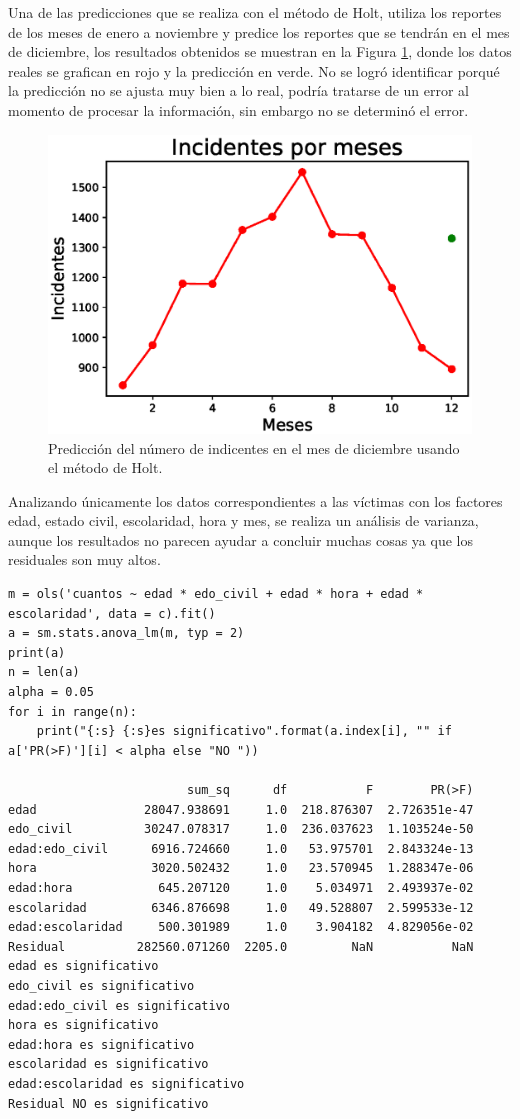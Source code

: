 \documentclass[final,5p,times]{elsarticle}
\begin{document}
Una de las predicciones que se realiza con el m\'etodo de Holt, utiliza los reportes de los meses de enero a noviembre y predice los reportes que se tendrán en el mes de diciembre, los resultados obtenidos se muestran en la Figura \ref{predic_mes}, donde los datos reales se grafican en rojo y la predicci\'on en verde. No se logr\'o identificar porqu\'e la predicci\'on no se ajusta muy bien a lo real, podr\'ia tratarse de un error al momento de procesar la informaci\'on, sin embargo no se determin\'o el error.
\begin{figure}
\centering
\includegraphics[scale=0.5]{pred_mes.eps}
\caption{Predicción del n\'umero de indicentes en el mes de diciembre usando el m\'etodo de Holt.}
\label{predic_mes}
\end{figure}

Analizando \'unicamente los datos correspondientes a las v\'ictimas con los factores edad, estado civil, escolaridad, hora y mes, se realiza un an\'alisis de varianza, aunque los resultados no parecen ayudar a concluir muchas cosas ya que los residuales son muy altos.
\begin{lstlisting}
m = ols('cuantos ~ edad * edo_civil + edad * hora + edad * escolaridad', data = c).fit() 
a = sm.stats.anova_lm(m, typ = 2)
print(a)
n = len(a)
alpha = 0.05
for i in range(n):
    print("{:s} {:s}es significativo".format(a.index[i], "" if a['PR(>F)'][i] < alpha else "NO "))
    
                         sum_sq      df           F        PR(>F)
edad               28047.938691     1.0  218.876307  2.726351e-47
edo_civil          30247.078317     1.0  236.037623  1.103524e-50
edad:edo_civil      6916.724660     1.0   53.975701  2.843324e-13
hora                3020.502432     1.0   23.570945  1.288347e-06
edad:hora            645.207120     1.0    5.034971  2.493937e-02
escolaridad         6346.876698     1.0   49.528807  2.599533e-12
edad:escolaridad     500.301989     1.0    3.904182  4.829056e-02
Residual          282560.071260  2205.0         NaN           NaN
edad es significativo
edo_civil es significativo
edad:edo_civil es significativo
hora es significativo
edad:hora es significativo
escolaridad es significativo
edad:escolaridad es significativo
Residual NO es significativo    
\end{lstlisting}
\end{document}
